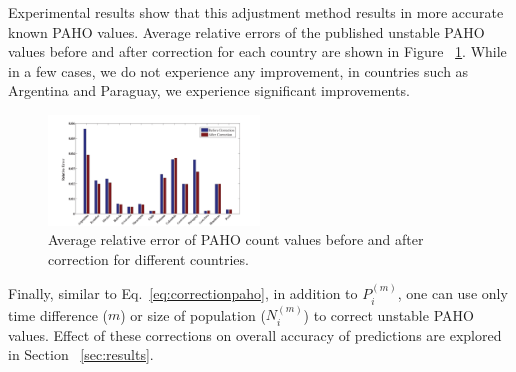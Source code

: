 Experimental results show that this adjustment method results in more accurate
known PAHO values. Average relative errors of the published unstable PAHO
values before and after correction for each
country are shown in Figure ~\ref{fig:avgrelerrors}. While in a few cases,
we do not experience any improvement, in countries such as Argentina and Paraguay,
we experience significant improvements.


\begin{figure}[h]
  \captionsetup{font=scriptsize}
  \centering
    \includegraphics[width=0.5\textwidth]{fig/errs}
  \caption{Average relative error of PAHO count values before and after 
  correction for different countries.}
  \label{fig:avgrelerrors}
\vspace{-1em}
\end{figure}

Finally, similar to Eq.~\ref{eq:correctionpaho}, in addition to $P_i^{(m)}$, one can
use only time difference ($m$) or size of population ($N_i^{(m)}$) to correct
unstable PAHO values. Effect of these corrections on overall accuracy of
predictions are explored in Section ~\ref{sec:results}.
